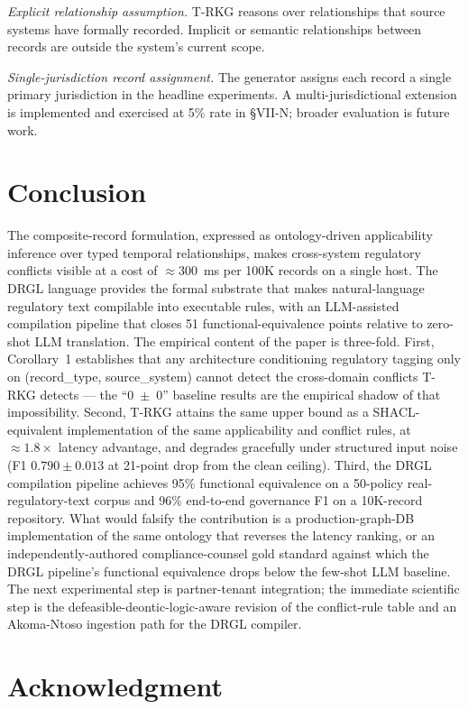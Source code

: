 \documentclass{ieeeaccess}
\begin{document}
\textit{Explicit relationship assumption.} T-RKG reasons over relationships that source systems have formally recorded. Implicit or semantic relationships between records are outside the system's current scope.

\textit{Single-jurisdiction record assignment.} The generator assigns each record a single primary jurisdiction in the headline experiments. A multi-jurisdictional extension is implemented and exercised at 5\% rate in §VII-N; broader evaluation is future work.

\section{Conclusion}

The composite-record formulation, expressed as ontology-driven applicability inference over typed temporal relationships, makes cross-system regulatory conflicts visible at a cost of $\approx 300$~ms per 100K records on a single host. The DRGL language provides the formal substrate that makes natural-language regulatory text compilable into executable rules, with an LLM-assisted compilation pipeline that closes 51 functional-equivalence points relative to zero-shot LLM translation. The empirical content of the paper is three-fold. First, Corollary~1 establishes that any architecture conditioning regulatory tagging only on (record\_type, source\_system) cannot detect the cross-domain conflicts T-RKG detects — the ``0~$\pm$~0'' baseline results are the empirical shadow of that impossibility. Second, T-RKG attains the same upper bound as a SHACL-equivalent implementation of the same applicability and conflict rules, at $\approx 1.8\times$ latency advantage, and degrades gracefully under structured input noise (F1 $0.790 \pm 0.013$ at 21-point drop from the clean ceiling). Third, the DRGL compilation pipeline achieves 95\% functional equivalence on a 50-policy real-regulatory-text corpus and 96\% end-to-end governance F1 on a 10K-record repository. What would falsify the contribution is a production-graph-DB implementation of the same ontology that reverses the latency ranking, or an independently-authored compliance-counsel gold standard against which the DRGL pipeline's functional equivalence drops below the few-shot LLM baseline. The next experimental step is partner-tenant integration; the immediate scientific step is the defeasible-deontic-logic-aware revision of the conflict-rule table and an Akoma-Ntoso ingestion path for the DRGL compiler.

\section*{Acknowledgment}
\end{document}
